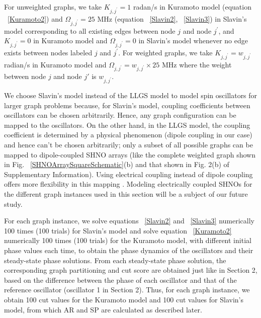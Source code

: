 \documentclass[10pt]{article}
\begin{document}
For unweighted graphs, we take  $K_{j, j^{\prime}}=1$ radan/s in Kuramoto model (equation ~\ref{Kuramoto2}) and $\Omega_{j, j^{\prime}}=25$ MHz (equation ~\ref{Slavin2}, ~\ref{Slavin3}) in Slavin's model corresponding to all existing edges between node $j$ and node $j^{\prime}$, and  $K_{j, j^{\prime}}=0$ in Kuramoto model and $\Omega_{j, j^{\prime}}=0$  in Slavin's model whenever no edge exists between nodes labeled $j$ and $j^{\prime}$. For weighted graphs, we take $K_{j, j^{\prime}}=w_{j, j^{\prime}}$ radian/s in Kuramoto model and $\Omega_{j, j^{\prime}}=w_{j, j^{\prime}}\times25$ MHz where the weight between node $j$ and node $j'$ is $w_{j, j^{\prime}}$. 

We choose Slavin's model instead of the LLGS model to model spin oscillators for larger graph problems because, for Slavin's model, coupling coefficients between oscillators can be chosen arbitrarily. Hence, any graph configuration can be mapped to the oscillators. On the other hand, in the LLGS model, the coupling coefficient is determined by a physical phenomenon (dipole coupling in our case) and hence can't be chosen arbitrarily; only a subset of all possible graphs can be mapped to dipole-coupled SHNO arrays (like the complete weighted graph shown in Fig. ~\ref{SHNOArraySquareSchematic}(b) and that shown in Fig. 2(b) of Supplementary Information). Using electrical coupling instead of dipole coupling offers more flexibility in this mapping \cite{Spin_Liu,Spin_Hyunsoo} . Modeling electrically coupled SHNOs for the different graph instances used in this section will be a subject of our future study. 

For each graph instance, we solve equations ~\ref{Slavin2} and ~\ref{Slavin3} numerically 100 times (100 trials) for Slavin's model and solve equation ~\ref{Kuramoto2} numerically 100 times (100 trials) for the Kuramoto model, with different initial phase values each time, to obtain the phase dynamics of the oscillators and their steady-state phase solutions. From each steady-state phase solution, the corresponding graph partitioning and cut score are obtained just like in Section 2, based on the difference between the phase of each oscillator and that of the reference oscillator (oscillator 1 in Section 2). Thus, for each graph instance, we obtain 100 cut values for the Kuramoto model and 100 cut values for Slavin's model, from which AR and SP are calculated as described later. 

\end{document}
